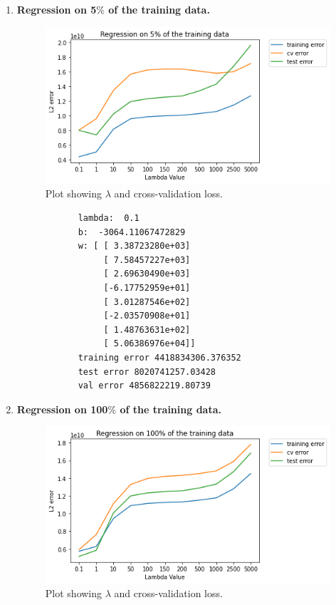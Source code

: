     \begin{enumerate}
        \item \textbf{Regression on 5$\%$ of the training data.} 
        
        \begin{figure}[H]
            \centering
            \includegraphics[scale=0.5, angle=0]{templates/1_2_1.png}
            \caption{Plot showing $\lambda$ and cross-validation loss.}
            \label{fig:my_label}
        \end{figure}
        
        \begin{verbatim}
            lambda:  0.1  
            b:  -3064.11067472829
            w: [ [ 3.38723280e+03]
                 [ 7.58457227e+03]
                 [ 2.69630490e+03]
                 [-6.17752959e+01]
                 [ 3.01287546e+02]
                 [-2.03570908e+01]
                 [ 1.48763631e+02]
                 [ 5.06386976e+04]]
            training error 4418834306.376352
            test error 8020741257.03428
            val error 4856822219.80739
        \end{verbatim}
        \newpage
        \item \textbf{Regression on 100$\%$ of the training data.} 
        
        \begin{figure}[H]
            \centering
            \includegraphics[scale=0.5, angle=0]{templates/1_2_2}
            \caption{Plot showing $\lambda$ and cross-validation loss.}
            \label{fig:my_label}
        \end{figure}
        

\end{enumerate}
